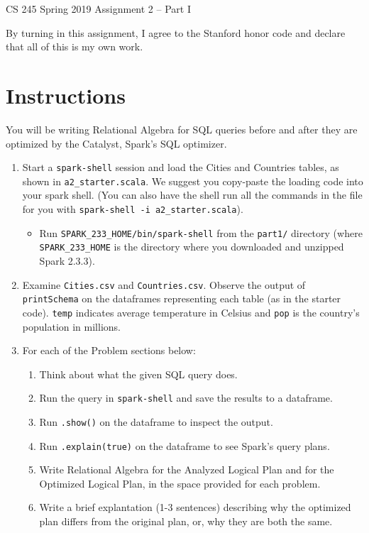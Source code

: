 \documentclass[12pt]{article}
\begin{document}
\begin{center}
{\Large CS 245 Spring 2019 Assignment 2 -- Part I}
\end{center}

By turning in this assignment, I agree to the Stanford honor code and declare
that all of this is my own work.

\section*{Instructions}
You will be writing Relational Algebra for SQL queries before and after
they are optimized by the Catalyst, Spark's SQL optimizer.

\begin{enumerate}
    \item Start a \texttt{spark-shell} session and load the Cities and Countries
        tables, as shown in \texttt{a2\_starter.scala}.
        We suggest you copy-paste the loading code into your spark shell.
        (You can also have the shell run all the commands in the file
        for you with \texttt{spark-shell -i a2\_starter.scala}).
    \begin{itemize}
        \item Run \texttt{SPARK\_233\_HOME/bin/spark-shell}
        from the \texttt{part1/} directory
        (where \\
        \texttt{SPARK\_233\_HOME} is the directory where you
        downloaded and unzipped Spark 2.3.3).

    \end{itemize}

    \item Examine \texttt{Cities.csv} and \texttt{Countries.csv}.
        Observe the output of \texttt{printSchema} on the dataframes
        representing each table (as in the starter code).
        \texttt{temp} indicates average temperature in Celsius and
        \texttt{pop} is the country's population in millions.
    \item For each of the Problem sections below:
    \begin{enumerate}
        \item Think about what the given SQL query does.
        \item Run the query in \texttt{spark-shell} and save the results to a dataframe.
        \item Run \texttt{.show()} on the dataframe to inspect the output.
        \item Run \texttt{.explain(true)} on the dataframe to see Spark's
            query plans.
        \item Write Relational Algebra for the Analyzed Logical Plan
            and for the Optimized Logical Plan, in the space provided
            for each problem.
        \item Write a brief explantation (1-3 sentences) describing why the optimized
            plan differs from the original plan, or, why they are both the same.
    \end{enumerate}
\end{enumerate}
\end{document}
